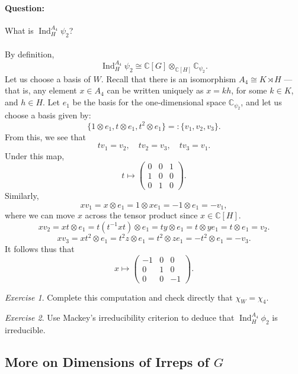 \documentclass[a4paper]{report}
\theoremstyle{definition}
\theoremstyle{remark}
\theoremstyle{proposition}
\theoremstyle{conjecture}
\theoremstyle{lemma}
\theoremstyle{corollary}
\theoremstyle{exercise}
\newtheorem{exercise}{Exercise}
\theoremstyle{example}
\newcommand{\C}{\mathbb{C}}
\newcommand{\on}{\operatorname}
\begin{document}
\paragraph{Question:} What is $\on{Ind}_H^{A_4}\psi_2$?\\\\
By definition,
$$\on{Ind}_H^{A_4} \psi_2 \cong \C[G] \otimes_{\C[H]}\C_{\psi_2}.$$
Let us choose a basis of $W$. Recall that there is an isomorphism
$A_4 \cong K \rtimes H$ --- that is, any element $x\in A_4$ can be 
written uniquely as $x = kh$, for some $k\in K$, and $h\in H$. 
Let $e_1$ be the basis for the one-dimensional space $\C_{\psi_2}$,
and let us choose a basis given by:
$$\lbrace 1\otimes e_1, t\otimes e_1, t^2 \otimes e_1\rbrace =: \lbrace v_1,v_2,v_3\rbrace.$$
From this, we see that $$tv_1 = v_2, \quad tv_2 = v_3, \quad tv_3 = v_1.$$
Under this map, $$t\longmapsto \begin{pmatrix}
    0&0&1\\
    1&0&0\\
    0&1&0
\end{pmatrix}.$$
Similarly,
$$xv_1 = x\otimes e_1 = 1\otimes xe_1 = -1\otimes e_1 = -v_1,$$
where we can move $x$ across the tensor product since $x \in \C[H]$.
$$xv_2 = xt\otimes e_1 = t(t^{-1}xt)\otimes e_1 = ty\otimes e_1 = t\otimes ye_1 = t\otimes e_1 = v_2.$$
$$xv_3 = xt^2\otimes e_1 = t^2z \otimes e_1 = t^2 \otimes ze_1 = -t^2\otimes e_1 = -v_3.$$
It follows thus that 
$$x\longmapsto \begin{pmatrix}
    -1&0&0\\
    0&1&0\\
    0&0&-1
\end{pmatrix}.$$

\begin{exercise}
    Complete this computation and check directly that $\chi_W = \chi_4$.
\end{exercise}

\begin{exercise}
    Use Mackey's irreducibility criterion  to deduce that 
    $\on{Ind}_{H}^{A_4}\phi_2$ is irreducible.
\end{exercise}

\subsection{More on Dimensions of Irreps of $G$}
\end{document}
